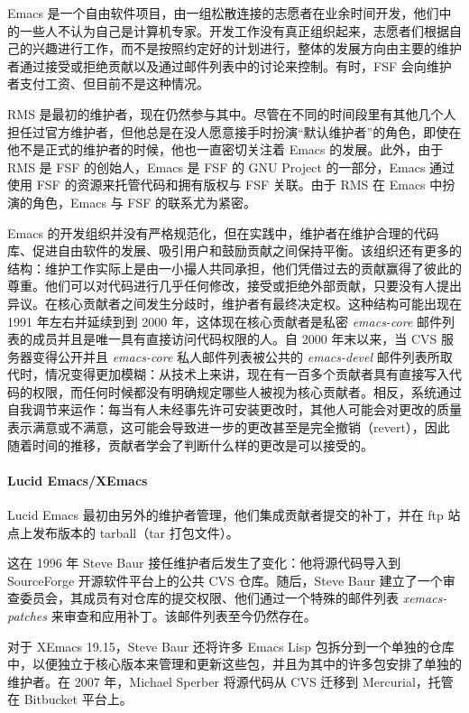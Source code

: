 \documentclass[format=acmsmall,screen]{acmart}
\begin{document}
Emacs 是一个自由软件项目，由一组松散连接的志愿者在业余时间开发，他们中的一些人不认为自己是计算机专家。开发工作没有真正组织起来，志愿者们根据自己的兴趣进行工作，而不是按照约定好的计划进行，整体的发展方向由主要的维护者通过接受或拒绝贡献以及通过邮件列表中的讨论来控制。有时，FSF 会向维护者支付工资、但目前不是这种情况。

RMS 是最初的维护者，现在仍然参与其中。尽管在不同的时间段里有其他几个人担任过官方维护者，但他总是在没人愿意接手时扮演“默认维护者”的角色，即使在他不是正式的维护者的时候，他也一直密切关注着 Emacs 的发展。此外，由于 RMS 是 FSF 的创始人，Emacs 是 FSF 的 GNU Project 的一部分，Emacs 通过使用 FSF 的资源来托管代码和拥有版权与 FSF 关联。由于 RMS 在 Emacs 中扮演的角色，Emacs 与 FSF 的联系尤为紧密。

Emacs 的开发组织并没有严格规范化，但在实践中，维护者在维护合理的代码库、促进自由软件的发展、吸引用户和鼓励贡献之间保持平衡。该组织还有更多的结构：维护工作实际上是由一小撮人共同承担，他们凭借过去的贡献赢得了彼此的尊重。他们可以对代码进行几乎任何修改，接受或拒绝外部贡献，只要没有人提出异议。在核心贡献者之间发生分歧时，维护者有最终决定权。这种结构可能出现在 1991 年左右并延续到到 2000 年，这体现在核心贡献者是私密 \emph{emacs-core} 邮件列表的成员并且是唯一具有直接访问代码权限的人。自 2000 年末以来，当 CVS 服务器变得公开并且 \emph{emacs-core} 私人邮件列表被公共的 \emph{emacs-devel} 邮件列表所取代时，情况变得更加模糊：从技术上来讲，现在有一百多个贡献者具有直接写入代码的权限，而任何时候都没有明确规定哪些人被视为核心贡献者。相反，系统通过自我调节来运作：每当有人未经事先许可安装更改时，其他人可能会对更改的质量表示满意或不满意，这可能会导致进一步的更改甚至是完全撤销（revert），因此随着时间的推移，贡献者学会了判断什么样的更改是可以接受的。

\paragraph{Lucid Emacs/XEmacs}

Lucid Emacs 最初由另外的维护者管理，他们集成贡献者提交的补丁，并在 ftp 站点上发布版本的 tarball（tar 打包文件）。

这在 1996 年 Steve Baur 接任维护者后发生了变化：他将源代码导入到 SourceForge 开源软件平台上的公共 CVS 仓库。随后，Steve Baur 建立了一个审查委员会，其成员有对仓库的提交权限、他们通过一个特殊的邮件列表 \emph{xemacs-patches} 来审查和应用补丁。该邮件列表至今仍然存在。

对于 XEmacs 19.15，Steve Baur 还将许多 Emacs Lisp 包拆分到一个单独的仓库中，以便独立于核心版本来管理和更新这些包，并且为其中的许多包安排了单独的维护者。在 2007 年，Michael Sperber 将源代码从 CVS 迁移到 Mercurial，托管在 Bitbucket 平台上。
\end{document}
